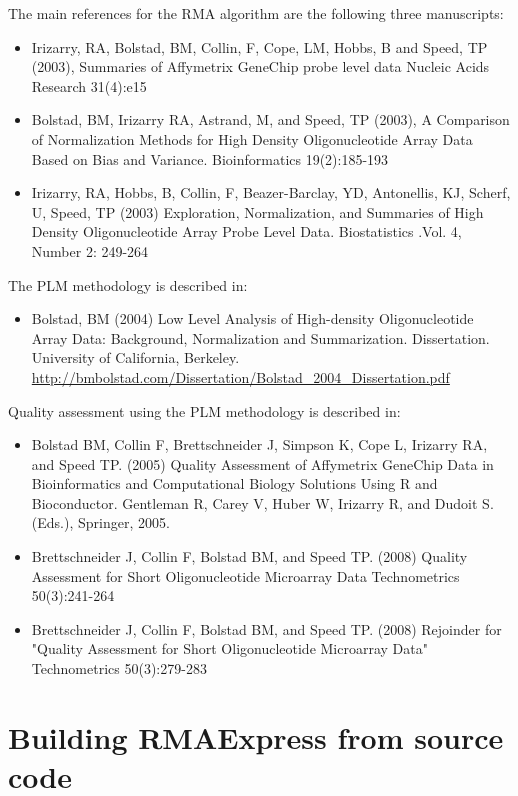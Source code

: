 \documentclass[11pt]{report}
\begin{document}
The main references for the RMA algorithm are the following three manuscripts:
\begin{itemize}
\item Irizarry, RA, Bolstad, BM, Collin, F, Cope, LM, Hobbs, B and Speed, TP (2003), Summaries of Affymetrix GeneChip probe level data Nucleic Acids Research 31(4):e15

\item Bolstad, BM, Irizarry RA, Astrand, M, and Speed, TP (2003), A Comparison of Normalization Methods for High Density Oligonucleotide Array Data Based on Bias and Variance. Bioinformatics 19(2):185-193
  
\item Irizarry, RA, Hobbs, B, Collin, F, Beazer-Barclay, YD, Antonellis, KJ, Scherf, U, Speed, TP (2003) Exploration, Normalization, and Summaries of High Density Oligonucleotide Array Probe Level Data. Biostatistics .Vol. 4, Number 2: 249-264 
\end{itemize}

The PLM methodology is described in:
\begin{itemize}
\item Bolstad, BM (2004) Low Level Analysis of High-density Oligonucleotide Array Data: Background, Normalization and Summarization. Dissertation. University of California, Berkeley. \url{http://bmbolstad.com/Dissertation/Bolstad_2004_Dissertation.pdf}
\end{itemize}

Quality assessment using the PLM methodology is described in:
\begin{itemize}
\item Bolstad BM, Collin F, Brettschneider J, Simpson K, Cope L, Irizarry RA, and Speed TP. (2005) Quality Assessment of Affymetrix GeneChip Data in Bioinformatics and Computational Biology Solutions Using R and Bioconductor. Gentleman R, Carey V, Huber W, Irizarry R, and  Dudoit S. (Eds.), Springer, 2005.
\item Brettschneider J, Collin F, Bolstad BM, and Speed TP. (2008) Quality Assessment for Short Oligonucleotide Microarray Data Technometrics 50(3):241-264
\item Brettschneider J, Collin F, Bolstad BM, and Speed TP. (2008) Rejoinder for "Quality Assessment for Short Oligonucleotide Microarray Data" Technometrics 50(3):279-283 

\end{itemize}


\chapter{Building RMAExpress from source code} \label{chap:building}
\end{document}
